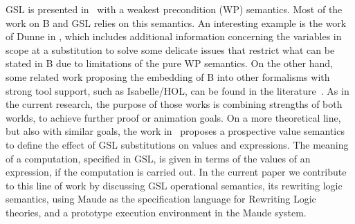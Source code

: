 \documentclass[a4paper,openany]{book}
\begin{document}
GSL is presented in~\cite{b-book} with a weakest precondition (WP) semantics. Most of the work on B and GSL relies on this semantics. An interesting example is the work of Dunne in \cite{Dunne2002}, which includes additional information concerning the variables in scope at a substitution to solve some delicate issues that restrict what can be stated in B due to limitations of the pure WP semantics.  On the other hand, some related work proposing the embedding of B into other formalisms with strong tool support, such as Isabelle/HOL, can be found in the literature~\cite{Chartier1998,Deharbe2016}.  As in the current research, the purpose of those works is combining strengths of both worlds, to achieve further proof or animation goals. On a more theoretical line, but also with similar goals, the work in~\cite{Zeyda2005}  proposes a prospective value semantics to define the effect of GSL substitutions on values and expressions. The meaning of a computation, specified in GSL, is given in terms of the values of an expression, if the computation is carried out.  In the current paper we contribute to this line of work by discussing GSL operational semantics, its rewriting logic semantics, using Maude as the specification language for Rewriting Logic theories, and a prototype execution environment in the Maude system. %

%
%
\end{document}
